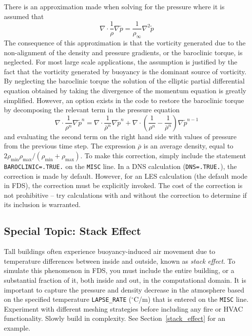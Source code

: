 \documentclass[11pt]{book}
\newcommand{\ct}{\tt\small}
\newcommand{\tp}{\tilde{p}}
\newcommand{\be}{\begin{equation}}
\newcommand{\ee}{\end{equation}}
\begin{document}
There is an approximation made when solving for the pressure where it is assumed that
\be \nabla \cdot \frac{1}{\rho} \nabla \tp = \frac{1}{\rho_\infty} \nabla^2 \tp \label{Happrox} \ee
The consequence of this approximation is that the vorticity generated
due to the non-alignment of the density and pressure gradients, or the
baroclinic torque, is neglected. For most large scale applications,
the assumption is justified by the fact that the vorticity generated by
buoyancy is the dominant source of vorticity.
By neglecting the baroclinic torque the
solution of the elliptic partial differential equation obtained by
taking the divergence of the momentum equation is greatly simplified.
However, an option exists in the code to restore the baroclinic torque by
decomposing the relevant term in the pressure equation
\be \nabla \cdot \frac{1}{\rho^n} \nabla \tp^n = \nabla \cdot \frac{1}{\overline{\rho}^n} \nabla \tp^n +
   \nabla \cdot \left( \frac{1}{\rho^n} - \frac{1}{\overline{\rho}^n} \right) \nabla \tp^{n-1}   \ee
and evaluating the second term on the right hand side with values of
pressure from the
previous time step. The expression $\overline{\rho}$ is an average density,
equal to $2 \rho_{\min} \rho_{\max} / (\rho_{\min} + \rho_{\max})$.
To make this correction, simply include the statement {\ct BAROCLINIC=.TRUE.}
on the {\ct MISC} line. In a DNS calculation ({\ct DNS=.TRUE.}), the
correction is made by default. However, for an LES calculation (the default mode in FDS),
the correction must be explicitly invoked. The cost of the
correction is not prohibitive -- try calculations with and without
the correction to determine if its inclusion is warranted.




\subsection{Special Topic: Stack Effect}
\label{info:stackeffect} 

Tall buildings often experience buoyancy-induced air movement due to temperature differences
between inside and outside, known as {\em stack effect}. To simulate this phenomenon in FDS, you must
include the entire building, or a substantial fraction of it, both inside and out, in the computational domain. It
is important to capture the pressure and density decrease in the atmosphere based on the specified
temperature {\ct LAPSE\_RATE} ($^\circ$C/m) that is entered on the {\ct MISC} line. Experiment with different meshing
strategies before including any fire or HVAC  functionality. Slowly build in complexity. See Section~\ref{stack_effect} for an example.
\end{document}
